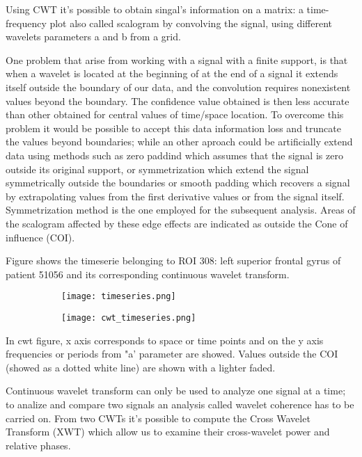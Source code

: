 \documentclass[a4paper,11pt]{article}
\begin{document}
Using CWT it's possible to obtain singal's information on a matrix: a time-frequency plot also called scalogram by convolving the signal, using different wavelets parameters a and b from a grid.


One problem that arise from working with a signal with a finite support, is that when a wavelet is located at the beginning of at the end of a signal it extends itself outside the boundary of our data, and the convolution requires nonexistent values beyond the boundary. The confidence value obtained is then less accurate than other obtained for central values of time/space location.
To overcome this problem it would be possible to accept this data information loss and truncate the values beyond boundaries; while an other aproach could be artificially extend data using methods such as zero paddind which assumes that the signal is zero outside its original support, or symmetrization which extend the signal symmetrically outside the boundaries or smooth padding which recovers a signal by extrapolating values from the first derivative values or from the signal itself.
Symmetrization method is the one employed for the subsequent analysis.
Areas of the scalogram affected by these edge effects are indicated as outside the Cone of influence (COI).

Figure shows the timeserie belonging to ROI 308: left superior frontal gyrus of patient 51056 and its corresponding continuous wavelet transform.

\begin{figure}
\begin{subfigure}{0.5\textwidth}
\texttt{[image: timeseries.png]}
\caption{}
\label{}
\end{subfigure}
\begin{subfigure}{0.5\textwidth}
\texttt{[image: cwt\_timeseries.png]}
\end{subfigure}
\caption{}
\label{}
\end{figure}

In cwt figure, x axis corresponds to space or time points and on the y axis frequencies or periods from "a' parameter are showed.
Values outside the COI (showed as a dotted white line) are shown with a lighter faded.




Continuous wavelet transform can only be used to analyze one signal at a time; to analize and compare two signals an analysis called wavelet coherence has to be carried on.
From two CWTs it's possible to compute the Cross Wavelet Transform (XWT) which allow us to examine their cross-wavelet power and relative phases.
\end{document}
